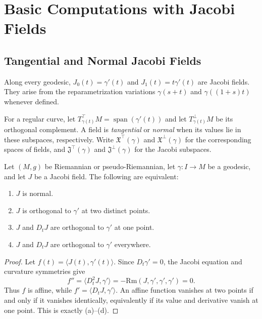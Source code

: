 \section{Basic Computations with Jacobi Fields}

\subsection{Tangential and Normal Jacobi Fields}

Along every geodesic, $J_0(t)=\gamma'(t)$ and $J_1(t)=t\gamma'(t)$ are Jacobi
fields.  They arise from the reparametrization variations
$\gamma(s+t)$ and $\gamma((1+s)t)$ whenever defined.

For a regular curve, let
$T^\top_{\gamma(t)}M=\operatorname{span}(\gamma'(t))$ and let
$T^\perp_{\gamma(t)}M$ be its orthogonal complement.  A field is
\emph{tangential} or \emph{normal} when its values lie in these subspaces,
respectively.  Write $\mathfrak X^\top(\gamma)$ and
$\mathfrak X^\perp(\gamma)$ for the corresponding spaces of fields, and
$\mathfrak J^\top(\gamma)$ and $\mathfrak J^\perp(\gamma)$ for the Jacobi
subspaces.

\begin{proposition}
\label{prop:normal-jacobi-equivalent-conditions}
Let $(M,g)$ be Riemannian or pseudo-Riemannian, let $\gamma:I\to M$ be a
geodesic, and let $J$ be a Jacobi field.  The following are equivalent:
\begin{enumerate}
\item[(a)] $J$ is normal.
\item[(b)] $J$ is orthogonal to $\gamma'$ at two distinct points.
\item[(c)] $J$ and $D_tJ$ are orthogonal to $\gamma'$ at one point.
\item[(d)] $J$ and $D_tJ$ are orthogonal to $\gamma'$ everywhere.
\end{enumerate}
\end{proposition}

\begin{proof}
\sketch
Let $f(t)=\langle J(t),\gamma'(t)\rangle$.  Since $D_t\gamma'=0$, the Jacobi
equation and curvature symmetries give
\[
f''=\langle D_t^2J,\gamma'\rangle
=-\mathrm{Rm}(J,\gamma',\gamma',\gamma')=0.
\]
Thus $f$ is affine, while
$f'=\langle D_tJ,\gamma'\rangle$.  An affine function vanishes at two points
if and only if it vanishes identically, equivalently if its value and
derivative vanish at one point.  This is exactly (a)--(d).
\end{proof}

